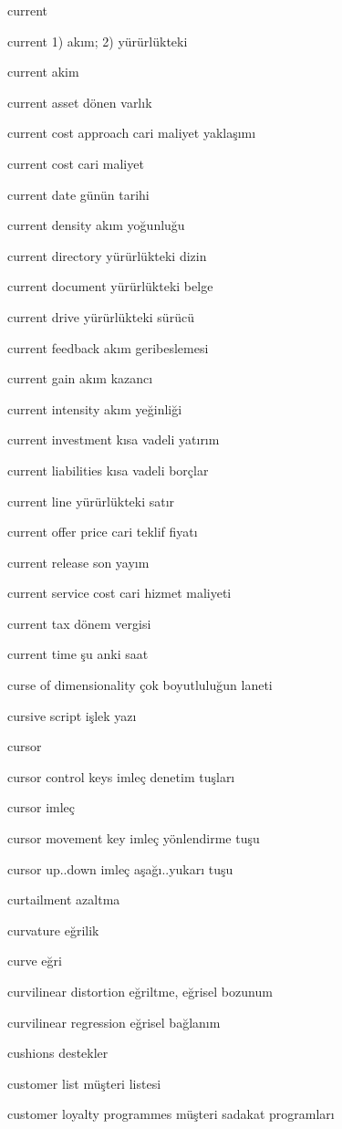 \documentclass[12pt,fleqn]{article}\usepackage{../../common}
\begin{document}
current

current 1) akım; 2) yürürlükteki

current akim

current asset dönen varlık

current cost approach cari maliyet yaklaşımı

current cost cari maliyet

current date günün tarihi

current density akım yoğunluğu

current directory yürürlükteki dizin

current document yürürlükteki belge

current drive yürürlükteki sürücü

current feedback akım geribeslemesi

current gain akım kazancı

current intensity akım yeğinliği

current investment kısa vadeli yatırım

current liabilities kısa vadeli borçlar

current line yürürlükteki satır

current offer price cari teklif fiyatı

current release son yayım

current service cost cari hizmet maliyeti

current tax dönem vergisi

current time şu anki saat

curse of dimensionality çok boyutluluğun laneti

cursive script işlek yazı

cursor

cursor control keys imleç denetim tuşları

cursor imleç

cursor movement key imleç yönlendirme tuşu

cursor up..down imleç aşağı..yukarı tuşu

curtailment azaltma

curvature eğrilik

curve eğri

curvilinear distortion eğriltme, eğrisel bozunum

curvilinear regression eğrisel bağlanım

cushions destekler

customer list müşteri listesi

customer loyalty programmes müşteri sadakat programları
\end{document}
